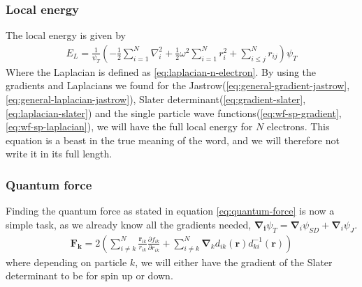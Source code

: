\documentclass[11pt]{article}
\begin{document}







\subsubsection{Local energy}
The local energy is given by
\begin{align}
	E_L = \frac{1}{\psi_T}\left( -\frac{1}{2}\sum^N_{i=1}\nabla_i^2 + \frac{1}{2}\omega^2\sum^N_{i=1}r^2_i + \sum^N_{i\leq j}r_{ij} \right)\psi_T
	\label{eq:n-electron-local-energy}
\end{align}
Where the Laplacian is defined as \eqref{eq:laplacian-n-electron}. By using the gradients and Laplacians we found for the Jastrow(\eqref{eq:general-gradient-jastrow},\eqref{eq:general-laplacian-jastrow}), Slater determinant(\eqref{eq:gradient-slater},\eqref{eq:laplacian-slater}) and the single particle wave functions(\eqref{eq:wf-sp-gradient},\eqref{eq:wf-sp-laplacian}), we will have the full local energy for $N$ electrons. This equation is a beast in the true meaning of the word, and we will therefore not write it in its full length. 

\subsubsection{Quantum force}
Finding the quantum force as stated in equation \eqref{eq:quantum-force} is now a simple task, as we already know all the gradients needed, $\bm{\nabla_i}\psi_T = \bm{\nabla}_i\psi_{SD} + \bm{\nabla}_i\psi_J$.
\begin{align}
	\mathbf{F_k} = 2 \left( \sum^N_{i\neq k} \frac{\mathbf{r}_{ik}}{r_{ik}}\frac{\partial f_{ik}}{\partial r_{ik}} + \sum_{i\neq k}^N\bm{\nabla}_k d_{ik}(\mathbf{r})d_{ki}^{-1}(\mathbf{r}) \right)
\end{align}
where depending on particle $k$, we will either have the gradient of the Slater determinant to be for spin up or down.
\end{document}
